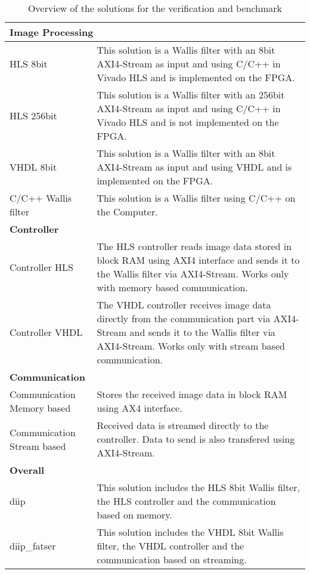 \begin{table}[tb!]
    \centering
    \begin{tabular}{p{3.8cm} p{10cm}}
        \toprule
        \multicolumn{2}{l}{\textbf{Image Processing}}\\
        \toprule
        HLS 8bit & This solution is a Wallis filter with an 8bit AXI4-Stream as input and using C/C++ in Vivado HLS and is implemented on the FPGA.\\
        \midrule
        HLS 256bit & This solution is a Wallis filter with an 256bit AXI4-Stream as input and using C/C++ in Vivado HLS and is not implemented on the FPGA.\\
        \midrule
        VHDL 8bit & This solution is a Wallis filter with an 8bit AXI4-Stream as input and using VHDL and is implemented on the FPGA.\\
        \midrule
        C/C++ Wallis filter & This solution is a Wallis filter using C/C++ on the Computer.\\
        \toprule
        \multicolumn{2}{l}{\textbf{Controller}}\\
        \toprule
        Controller HLS &  The HLS controller reads image data stored in block RAM using AXI4 interface and sends it to the Wallis filter via AXI4-Stream. Works only with memory based communication. \\
        \midrule
        Controller VHDL & The VHDL controller receives image data directly from the communication part via AXI4-Stream and sends it to the Wallis filter via AXI4-Stream. Works only with stream based communication. \\
        \toprule
        \multicolumn{2}{l}{\textbf{Communication}}\\
        \toprule
        Communication Memory based & Stores the received image data in block RAM using AX4 interface. \\
        \midrule
        Communication Stream based & Received data is streamed directly to the controller. Data to send is also transfered using AXI4-Stream. \\
        \toprule
        \multicolumn{2}{l}{\textbf{Overall}}\\
        \toprule
        diip & This solution includes the HLS 8bit Wallis filter, the HLS controller and the communication based on memory. \\
        \midrule
        diip\_fatser & This solution includes the VHDL 8bit Wallis filter, the VHDL controller and the communication based on streaming. \\
        \bottomrule
    \end{tabular}
    \caption{Overview of the solutions for the verification and benchmark}
    \label{tab:ver:overview}
\end{table}

